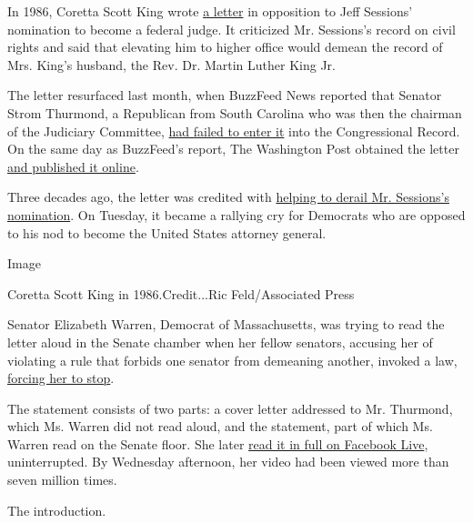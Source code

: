 In 1986, Coretta Scott King wrote
\href{https://www.documentcloud.org/documents/3259988-Scott-King-1986-Letter-and-Testimony-Signed.html\#document/p1}{a
letter} in opposition to Jeff Sessions' nomination to become a federal
judge. It criticized Mr. Sessions's record on civil rights and said that
elevating him to higher office would demean the record of Mrs. King's
husband, the Rev. Dr. Martin Luther King Jr.

The letter resurfaced last month, when BuzzFeed News reported that
Senator Strom Thurmond, a Republican from South Carolina who was then
the chairman of the Judiciary Committee,
\href{https://www.buzzfeed.com/johnstanton/coretta-scott-king-letter-jeff-sessions?utm_term=.de3onv7Lr\#.vlMxGBN0d}{had
failed to enter it} into the Congressional Record. On the same day as
BuzzFeed's report, The Washington Post obtained the letter
\href{https://www.washingtonpost.com/news/powerpost/wp/2017/01/10/read-the-letter-coretta-scott-king-wrote-opposing-sessionss-1986-federal-nomination/?utm_term=.a4855b1d22bd}{and
published it online}.

Three decades ago, the letter was credited with
\href{http://www.nytimes.com/1986/06/06/us/senate-panel-hands-reagan-first-defeat-on-nominee-for-judgeship.html}{helping
to derail Mr. Sessions's nomination}. On Tuesday, it became a rallying
cry for Democrats who are opposed to his nod to become the United States
attorney general.

Image

Coretta Scott King in 1986.Credit...Ric Feld/Associated Press

Senator Elizabeth Warren, Democrat of Massachusetts, was trying to read
the letter aloud in the Senate chamber when her fellow senators,
accusing her of violating a rule that forbids one senator from demeaning
another, invoked a law,
\href{https://www.nytimes.com/2017/02/07/us/politics/republican-senators-vote-to-formally-silence-elizabeth-warren.html}{forcing
her to stop}.

The statement consists of two parts: a cover letter addressed to Mr.
Thurmond, which Ms. Warren did not read aloud, and the statement, part
of which Ms. Warren read on the Senate floor. She later
\href{https://www.facebook.com/senatorelizabethwarren/videos/724337794395383/}{read
it in full on Facebook Live}, uninterrupted. By Wednesday afternoon, her
video had been viewed more than seven million times.

The introduction.

